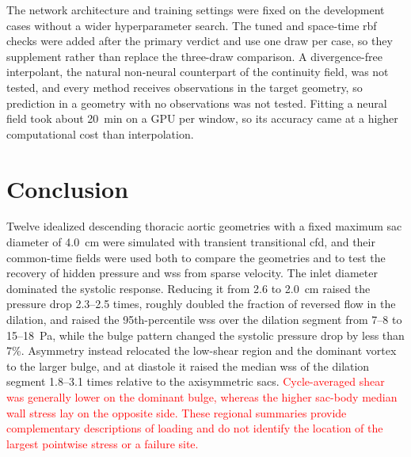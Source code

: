 \documentclass[12pt,a4paper]{article}
\newcommand{\cfdrevision}[1]{\textcolor{red}{#1}}
\newcommand{\CFD}{\ac{cfd}\xspace}
\newcommand{\WSS}{\ac{wss}\xspace}
\newcommand{\RBF}{\ac{rbf}\xspace}
\theoremstyle{definition}
\numberwithin{equation}{section}
\begin{document}
The network architecture and training settings were fixed on the development cases without a wider hyperparameter search. The tuned and space-time \RBF checks were added after the primary verdict and use one draw per case, so they supplement rather than replace the three-draw comparison. A divergence-free interpolant, the natural non-neural counterpart of the continuity field, was not tested, and every method receives observations in the target geometry, so prediction in a geometry with no observations was not tested. Fitting a neural field took about 20~min on a GPU per window, so its accuracy came at a higher computational cost than interpolation.


\section{Conclusion}
\label{sec:conclusion}
Twelve idealized descending thoracic aortic geometries with a fixed maximum sac diameter of 4.0~cm were simulated with transient transitional \CFD, and their common-time fields were used both to compare the geometries and to test the recovery of hidden pressure and \WSS from sparse velocity. The inlet diameter dominated the systolic response. Reducing it from 2.6 to 2.0~cm raised the pressure drop 2.3--2.5 times, roughly doubled the fraction of reversed flow in the dilation, and raised the 95th-percentile \WSS over the dilation segment from 7--8 to 15--18~Pa, while the bulge pattern changed the systolic pressure drop by less than 7\%. Asymmetry instead relocated the low-shear region and the dominant vortex to the larger bulge, and at diastole it raised the median \WSS of the dilation segment 1.8--3.1 times relative to the axisymmetric sacs. \cfdrevision{Cycle-averaged shear was generally lower on the dominant bulge, whereas the higher sac-body median wall stress lay on the opposite side. These regional summaries provide complementary descriptions of loading and do not identify the location of the largest pointwise stress or a failure site.}
\end{document}
